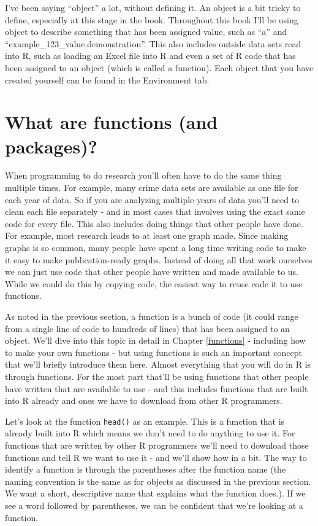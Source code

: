 \documentclass[
]{krantz}
\begin{document}
I've been saying ``object'' a lot, without defining it. An object is a bit tricky to define, especially at this stage in the book. Throughout this book I'll be using object to describe something that has been assigned value, such as ``a'' and ``example\_123\_value.demonstration''. This also includes outside data sets read into R, such as loading an Excel file into R and even a set of R code that has been assigned to an object (which is called a function). Each object that you have created yourself can be found in the Environment tab.

\hypertarget{functions-intro}{%
\section{What are functions (and packages)?}\label{functions-intro}}

When programming to do research you'll often have to do the same thing multiple times. For example, many crime data sets are available as one file for each year of data. So if you are analyzing multiple years of data you'll need to clean each file separately - and in most cases that involves using the exact same code for every file. This also includes doing things that other people have done. For example, most research leads to at least one graph made. Since making graphs is so common, many people have spent a long time writing code to make it easy to make publication-ready graphs. Instead of doing all that work ourselves we can just use code that other people have written and made available to us. While we could do this by copying code, the easiest way to reuse code it to use functions.

As noted in the previous section, a function is a bunch of code (it could range from a single line of code to hundreds of lines) that has been assigned to an object. We'll dive into this topic in detail in Chapter \ref{functions} - including how to make your own functions - but using functions is such an important concept that we'll briefly introduce them here. Almost everything that you will do in R is through functions. For the most part that'll be using functions that other people have written that are available to use - and this includes functions that are built into R already and ones we have to download from other R programmers.

Let's look at the function \texttt{head()} as an example. This is a function that is already built into R which means we don't need to do anything to use it. For functions that are written by other R programmers we'll need to download those functions and tell R we want to use it - and we'll show how in a bit. The way to identify a function is through the parentheses after the function name (the naming convention is the same as for objects as discussed in the previous section. We want a short, descriptive name that explains what the function does.). If we see a word followed by parentheses, we can be confident that we're looking at a function.
\end{document}
